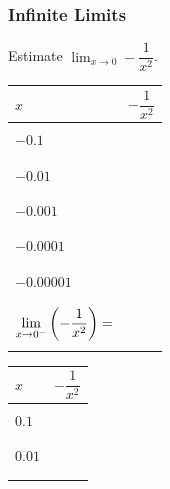 \documentclass[notes]{subfiles}
\begin{document}
	\subsubsection*{Infinite Limits}
		\begin{ex}
			Estimate $\displaystyle \lim_{x\to 0} -\dfrac{1}{x^2}$.
			\begin{center}
				\begin{minipage}{.45\textwidth}
					\tabulinesep=1mm
					\begin{tabu}{|X[c]|X[1.5,c]|}\hline
						$x$ 						& $-\dfrac{1}{x^2}$ \\ \hline
												& \\
						$-0.1$					& \\ 
												& \\ \hline
												& \\
						$-0.01$	& \\
												& \\ \hline 
												& \\
						$-0.001$	& \\ 
												& \\ \hline
												& \\ 
						$-0.0001$	& \\ 
												& \\ \hline
												& \\
						$-0.00001$	&\\
												&\\ \hline\hline
												&\\
						$\displaystyle \lim_{x\to 0^-}\left( -\dfrac{1}{x^2}\right) =$ & \\
												&\\ \hline
					\end{tabu}
				\end{minipage}
				\begin{minipage}{.45\textwidth}
					\tabulinesep=1mm
					\begin{tabu}{|X[c]|X[1.5,c]|}\hline
						$x$ 						& $-\dfrac{1}{x^2}$ \\ \hline
												& \\
						$ 0.1$					& \\ 
												& \\ \hline
												& \\
						$ 0.01$	& \\
												& \\ \hline 
												& \\

\end{tabu}
\end{minipage}
\end{center}
\end{ex}
\end{document}
